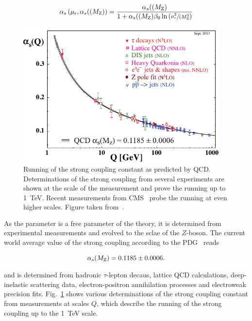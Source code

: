 \begin{equation*}
   \alpha_{s}\left(\mu_{\mathrm{r}}, \alpha_{s}((M_\mathrm{Z})\right) = \frac{\alpha_{s}((M_\mathrm{Z})}{1 + \alpha_{s}((M_\mathrm{Z})\beta_0 \ln
       \left( \sfrac{\mu_{\mathrm{r}}^2}{(M_\mathrm{Z}^2} \right)}
\end{equation*}

\begin{figure}[htb] 
    \centering
    \includegraphics[width=0.95\textwidth]{figures/sm_model/as_running.pdf}\hfill
    \caption[Running of the strong coupling]{Running of the strong coupling
        constant as predicted by QCD. Determinations of the strong coupling from
        several experiments are shown at the scale of the measurement and prove
        the running up to \SI{1}{\TeV}. Recent measurements from
        CMS~\cite{Khachatryan:2014waa,CMS:2014mna} probe the running at even
        higher scales. Figure taken from~\cite{Agashe:2014kda}.} 
    \label{fig:as_running} 
\end{figure}


As the parameter is a free parameter of the theory, it is determined from
experimental measurements and evolved to the sclae of the $Z$-boson. The current
world average value of the strong coupling according to the
PDG~\cite{Agashe:2014kda} reads

\begin{equation*}
    \alpha_{s}(M_\mathrm{Z}) = 0.1185 \pm 0.0006.
\end{equation*}

and is determined from hadronic $\tau$-lepton decaus, lattice QCD calculations,
deep-inelastic scattering data, electron-positron annihilation processes and
electroweak precision fits. Fig.~\ref{fig:as_running} shows various
determinations of the strong coupling constant from measurements at scales $Q$,
which describe the running of the strong coupling up to the \SI{1}{\TeV} scale.

